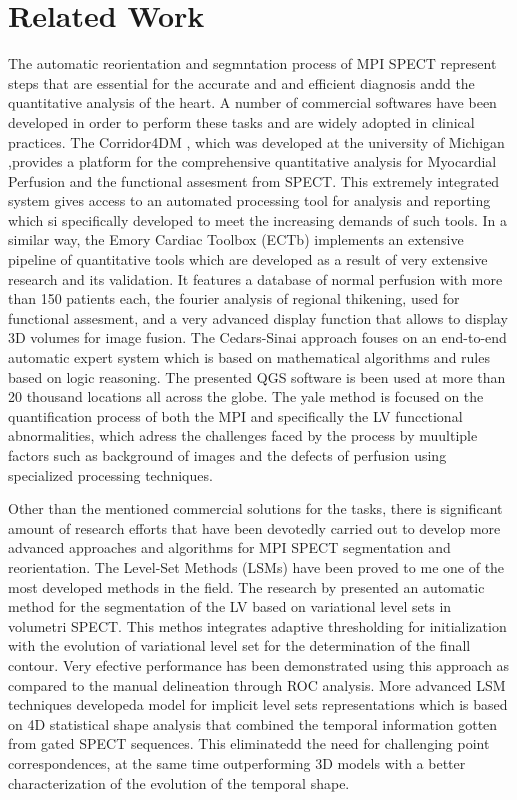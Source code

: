 \chapter{Related Work}
\label{ch:related}

The automatic reorientation and segmntation  process of MPI SPECT represent steps that are essential for the accurate and and efficient diagnosis andd the quantitative analysis of the heart. A number of commercial softwares have been developed in order to perform these tasks and are widely adopted in clinical practices. The Corridor4DM \cite{FICARO2007455}, which was developed at the university of Michigan ,provides a platform for the comprehensive quantitative analysis for Myocardial Perfusion and the functional assesment from SPECT. This extremely integrated system gives access to an automated processing tool for analysis and reporting  which si specifically developed to meet the increasing demands of such tools. In a similar way, the Emory Cardiac Toolbox (ECTb) \cite{GARCIA2007420} implements an extensive pipeline of quantitative tools which are developed as a result of very extensive research and its validation. It features a database of normal perfusion with more than 150 patients each, the fourier analysis of regional thikening, used for functional assesment, and a very advanced display function that allows to display 3D volumes for image fusion. The Cedars-Sinai approach \cite{GERMANO2007433} fouses on an end-to-end automatic expert system which is based on mathematical algorithms and rules based on logic reasoning. The presented QGS software is been used at more than 20 thousand locations all across the globe. The yale method \cite{LIU2007483} is focused on the quantification process of both the MPI and specifically the LV funcctional abnormalities, which adress the challenges faced by the process by muultiple factors such as background of images and the defects of perfusion  using specialized processing techniques.

Other than the mentioned commercial solutions for the tasks, there is significant amount of research efforts that have been devotedly carried out to develop more advanced approaches and algorithms for MPI SPECT segmentation and reorientation. The Level-Set Methods (LSMs) have been proved to me one of the most developed methods in the field. The research by \cite{DBLP:journals/cars/HosntalabMMA12} presented an automatic method for the segmentation of the LV based on variational level sets in volumetri SPECT. This methos integrates adaptive thresholding for initialization with the evolution of variational level set for the determination of the finall contour. Very efective performance has been demonstrated using this approach as compared to the manual delineation through ROC analysis. More advanced LSM techniques \cite{10.1007/11866565_12} developeda model for implicit level sets representations which is based on 4D statistical shape analysis that combined the temporal information  gotten from gated SPECT sequences. This eliminatedd the need for challenging point correspondences, at the same time outperforming 3D models with a better characterization of the evolution of the temporal shape.

